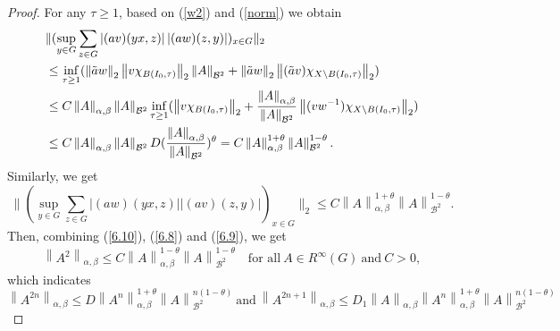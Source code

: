 \documentclass[preprint,11pt]{elsarticle}
\numberwithin{equation}{section}
\begin{document}
\begin{proof}
		\noindent For any $\tau \ge 1$, based on (\ref{w2}) and (\ref{norm}) we obtain
		\begin{align}\label{6.8}
			&  \|( \sup_{y\in G}\sum _{z\in G}\left | (av)(yx,z) \right | \left | (aw) (z,y)\right | )_{x\in G} \|_{2}\notag \\
			&\leq \inf_{\tau \ge 1}(\left \| \tilde {a} w \right \|_{2}\left \|  v\chi _{B(I_{0},\tau )} \right \|_{2}\left \| A \right \|_{\mathcal{B} ^{2}} +\left \| \tilde {a} w \right \|_{2}\left \| (\tilde {a} v)\chi _{X\setminus B(I_{0},\tau )} \right \|_{2}) \notag\\
			&\leq C\left \| A \right \|_{\alpha,\beta }\left \| A \right \| _{\mathcal{B} ^{2}} \inf_{\tau \ge 1}(\left \|  v\chi _{B(I_{0},\tau )} \right \|_{2} +\frac{\left \| A \right \|_{\alpha,\beta } }{\left \| A \right \|_{\mathcal{B}^{2}} } \left \| ( v w^{-1})\chi _{X\setminus B(I_{0},\tau )} \right \|_{2})\notag \\
			&\leq C\left \| A \right \|_{\alpha,\beta }\left \| A \right \| _{\mathcal{B} ^{2}}D(\frac{\left \| A \right \|_{\alpha,\beta } }{\left \| A \right \|_{\mathcal{B} ^{2}} })^{\theta } =C\left \| A \right \|_{\alpha,\beta }^{1+\theta }\left \| A \right \| _{\mathcal{B} ^{2}}^{1-\theta }.
		\end{align}
		Similarly, we get
		\begin{equation}
			\label{6.9}
			\|( \sup_{y\in G}\sum _{z\in G}\left | (aw)(yx,z) \right | \left | (av) (z,y)\right | )_{x\in G} \|_{2}\le C\left \| A \right \|_{\alpha,\beta}^{1+\theta }\left \| A \right \| _{\mathcal{B} ^{2}}^{1-\theta }.
		\end{equation}
		Then, combining (\ref{6.10}), (\ref{6.8}) and (\ref{6.9}), we get 	\begin{align*}%
			\left \| A ^2 \right \| _{\alpha,\beta}\le C \left \| A \right \|_{\alpha,\beta}^{1-\theta }  \left \| A \right \|_{\mathcal{B}^2 }^{1-\theta } \quad\text {for~all}~ A\in R^{\infty}\left ( G \right )~\text{and}~C>0,
		\end{align*}
		which indicates
		\begin{equation*}
			\left \| A^{2n} \right \|_{\alpha,\beta } 
			\le  D\left \| A^{n} \right \|_{\alpha,\beta }^{1+\theta }\left \| A \right \| _{\mathcal{B} ^{2}}^{n( 1-\theta) }~\text{and}~	\left \| A^{2n+1} \right \|_{\alpha,\beta } \le D_{1}\left \| A \right \|_{\alpha,\beta } \left \| A^{n} \right \|_{\alpha,\beta }^{1+\theta }\left \| A \right \| _{\mathcal{B} ^{2}}^{n(1-\theta) }
		\end{equation*}

\end{proof}
\end{document}
